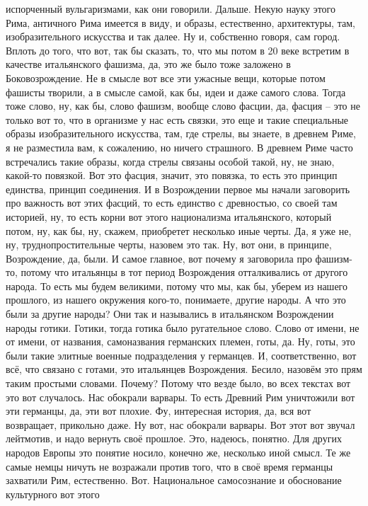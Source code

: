 испорченный вульгаризмами, как они говорили. Дальше. Некую науку этого Рима,
античного Рима имеется в виду, и образы, естественно, архитектуры, там,
изобразительного искусства и так далее. Ну и, собственно говоря, сам город.
Вплоть до того, что вот, так бы сказать, то, что мы потом в 20 веке встретим в
качестве итальянского фашизма, да, это же было тоже заложено в Боковозрождение.
Не в смысле вот все эти ужасные вещи, которые потом фашисты творили, а в смысле
самой, как бы, идеи и даже самого слова. Тогда тоже слово, ну, как бы, слово
фашизм, вообще слово фасции, да, фасция – это не только вот то, что в организме
у нас есть связки, это еще и такие специальные образы изобразительного
искусства, там, где стрелы, вы знаете, в древнем Риме, я не разместила вам, к
сожалению, но ничего страшного. В древнем Риме часто встречались такие образы,
когда стрелы связаны особой такой, ну, не знаю, какой-то повязкой. Вот это
фасция, значит, это повязка, то есть это принцип единства, принцип соединения. И
в Возрождении первое мы начали заговорить про важность вот этих фасций, то есть
единство с древностью, со своей там историей, ну, то есть корни вот этого
национализма итальянского, который потом, ну, как бы, ну, скажем, приобретет
несколько иные черты. Да, я уже не, ну, труднопростительные черты, назовем это
так. Ну, вот они, в принципе, Возрождение, да, были. И самое главное, вот почему
я заговорила про фашизм-то, потому что итальянцы в тот период Возрождения
отталкивались от другого народа. То есть мы будем великими, потому что мы, как
бы, уберем из нашего прошлого, из нашего окружения кого-то, понимаете, другие
народы. А что это были за другие народы? Они так и назывались в итальянском
Возрождении народы готики. Готики, тогда готика было ругательное слово. Слово от
имени, не от имени, от названия, самоназвания германских племен, готы, да. Ну,
готы, это были такие элитные военные подразделения у германцев. И,
соответственно, вот всё, что связано с готами, это итальянцев Возрождения.
Бесило, назовём это прям таким простыми словами. Почему? Потому что везде было,
во всех текстах вот это вот случалось. Нас обокрали варвары. То есть Древний Рим
уничтожили вот эти германцы, да, эти вот плохие. Фу, интересная история, да, вся
вот возвращает, прикольно даже. Ну вот, нас обокрали варвары. Вот этот вот
звучал лейтмотив, и надо вернуть своё прошлое. Это, надеюсь, понятно. Для других
народов Европы это понятие носило, конечно же, несколько иной смысл. Те же самые
немцы ничуть не возражали против того, что в своё время германцы захватили Рим,
естественно. Вот. Национальное самосознание и обоснование культурного вот этого

